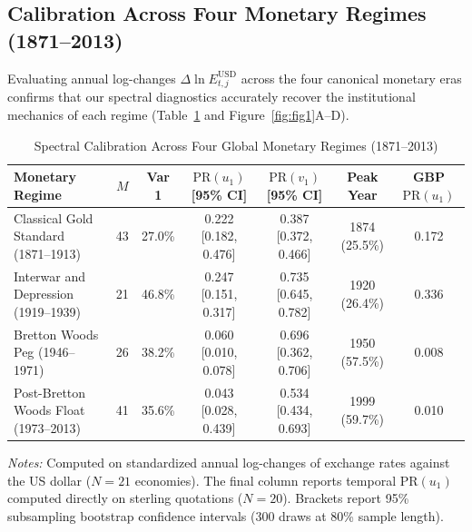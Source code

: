 \documentclass[11pt,a4paper]{article}
\begin{document}
\subsection{Calibration Across Four Monetary Regimes (1871--2013)}
Evaluating annual log-changes $\Delta \ln E_{t,j}^{\mathrm{USD}}$ across the four canonical monetary eras confirms that our spectral diagnostics accurately recover the institutional mechanics of each regime (Table~\ref{tab:modern_fx} and Figure~\ref{fig:fig1}A--D).

\begin{table}[htbp]
\centering
\caption{Spectral Calibration Across Four Global Monetary Regimes (1871--2013)}
\label{tab:modern_fx}
\scriptsize
\setlength{\tabcolsep}{2.2pt}
\begin{tabular}{@{}p{}cccccc@{}}
\toprule
\textbf{Monetary Regime} & \textbf{$M$} & \textbf{Var 1} & \textbf{$\mathrm{PR}(u_1)$ [95\% CI]} & \textbf{$\mathrm{PR}(v_1)$ [95\% CI]} & \textbf{Peak Year} & \textbf{GBP $\mathrm{PR}(u_1)$} \tabularnewline
\midrule
Classical Gold Standard (1871--1913) & 43 & 27.0\% & 0.222 [0.182, 0.476] & 0.387 [0.372, 0.466] & 1874 (25.5\%) & 0.172 \tabularnewline
Interwar and Depression (1919--1939) & 21 & 46.8\% & 0.247 [0.151, 0.317] & 0.735 [0.645, 0.782] & 1920 (26.4\%) & 0.336 \tabularnewline
Bretton Woods Peg (1946--1971) & 26 & 38.2\% & 0.060 [0.010, 0.078] & 0.696 [0.362, 0.706] & 1950 (57.5\%) & 0.008 \tabularnewline
Post-Bretton Woods Float (1973--2013) & 41 & 35.6\% & 0.043 [0.028, 0.439] & 0.534 [0.434, 0.693] & 1999 (59.7\%) & 0.010 \tabularnewline
\bottomrule
\end{tabular}
\vspace{1mm}
\begin{minipage}{\textwidth}
\footnotesize\emph{Notes:} Computed on standardized annual log-changes of exchange rates against the US dollar ($N = 21$ economies). The final column reports temporal $\mathrm{PR}(u_1)$ computed directly on sterling quotations ($N = 20$). Brackets report 95\% subsampling bootstrap confidence intervals (300 draws at 80\% sample length).
\end{minipage}
\end{table}
\end{document}
